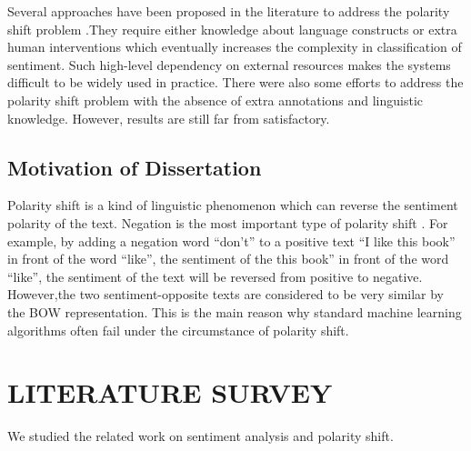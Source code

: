 \documentclass[oneside,a4paper,12pt]{pictreport}
\begin{document}
\par Several approaches have been proposed in the literature
to address the polarity shift problem .They require either knowledge about language constructs or
extra human interventions which eventually increases the complexity in classification of sentiment.  Such
high-level dependency on external resources makes the systems 
difficult to be widely used in practice. There were also
some efforts to address the polarity shift problem with the
absence of extra annotations and linguistic knowledge. However, results are still far from satisfactory.
\section{Motivation of Dissertation}
Polarity shift is a kind of linguistic phenomenon which can reverse the sentiment polarity of the text. Negation is
the most important type of polarity shift \cite{xiaOriginal}. For example, by adding a negation word “don’t” to a positive text “I like
this book” in front of the word “like”, the sentiment of the this book” in front of the word “like”, the sentiment of the
text will be reversed from positive to negative. However,the two sentiment-opposite texts are considered to be
very similar by the BOW representation. This is the main reason why standard machine learning algorithms often
fail under the circumstance of polarity shift.


\chapter{LITERATURE SURVEY}

We studied the related work on sentiment analysis and
polarity shift.
\end{document}
